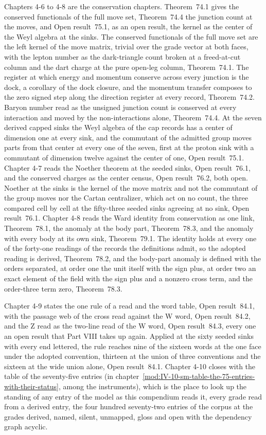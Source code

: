 Chapters 4-6 to 4-8 are the conservation chapters. Theorem~74.1 gives the conserved functionals of the full move set, Theorem~74.4 the junction count at the moves, and Open result~75.1, as an open result, the kernel as the center of the Weyl algebra at the sinks. The conserved functionals of the full move set are the left kernel of the move matrix, trivial over the grade vector at both faces, with the lepton number as the dark-triangle count broken at a freed-at-cut column and the dart charge at the pure open-leg column, Theorem~74.1. The register at which energy and momentum conserve across every junction is the dock, a corollary of the dock closure, and the momentum transfer composes to the zero signed step along the direction register at every record, Theorem~74.2. Baryon number read as the unsigned junction count is conserved at every interaction and moved by the non-interactions alone, Theorem~74.4. At the seven derived capped sinks the Weyl algebra of the cap records has a center of dimension one at every sink, and the commutant of the admitted group moves parts from that center at every one of the seven, first at the proton sink with a commutant of dimension twelve against the center of one, Open result~75.1. Chapter 4-7 reads the Noether theorem at the seeded sinks, Open result~76.1, and the conserved charges as the center census, Open result~76.2, both open. Noether at the sinks is the kernel of the move matrix and not the commutant of the group moves nor the Cartan centralizer, which act on no count, the three compared cell by cell at the fifty-three seeded sinks agreeing at no sink, Open result~76.1. Chapter 4-8 reads the Ward identity from conservation as one link, Theorem~78.1, the anomaly at the body part, Theorem~78.3, and the anomaly with every body at its own sink, Theorem~79.1. The identity holds at every one of the forty-one readings of the records the definitions admit, so the adopted reading is derived, Theorem~78.2, and the body-part anomaly is defined with the orders separated, at order one the unit itself with the sign plus, at order two an exact element of the field with the sign plus and a nonzero cross term, and the order-three term zero, Theorem~78.3.

Chapter 4-9 states the one rule of a read and the word table, Open result~84.1, with the passage web of the cross read against the W word, Open result~84.2, and the Z read as the two-line read of the W word, Open result~84.3, every one an open result that Part VIII takes up again. Applied at the sixty seeded sinks with every end lettered, the rule reaches nine of the sixteen words at the one face under the adopted convention, thirteen at the union of three conventions and the sixteen at the wide union alone, Open result~84.1. Chapter 4-10 closes with the table of the seventy-five entries (in chapter~\ref{mod:IV-10-sm-table-the-75-entries-with-their-status}, among the instruments), which is the place to look up the standing of any entry of the model as this compendium reads it, every grade read from a derived entry, the four hundred seventy-two entries of the corpus at the grades derived, named, silent, unmapped, gloss and open with the dependency graph acyclic.

